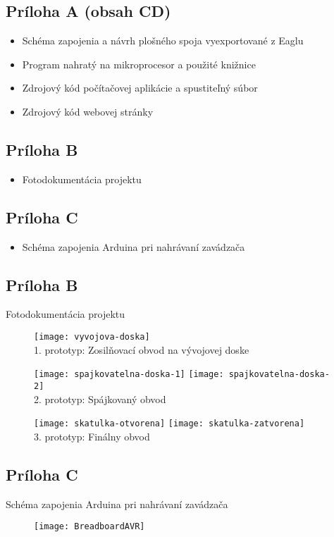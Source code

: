 \documentclass[titlepage,12pt]{article}
\begin{document}
\subsection*{Príloha A (obsah CD)}
\begin{itemize}
	\item Schéma zapojenia a návrh plošného spoja vyexportované z Eaglu
	\item Program nahratý na mikroprocesor a použité knižnice
	\item Zdrojový kód počítačovej aplikácie a spustiteľný súbor
	\item Zdrojový kód webovej stránky
\end{itemize}
\subsection*{Príloha B}
\begin{itemize}
	\item Fotodokumentácia projektu
\end{itemize}
\subsection*{Príloha C}
\begin{itemize}
	\item Schéma zapojenia Arduina pri nahrávaní zavádzača
\end{itemize}


\newpage 
\subsection*{Príloha B}
Fotodokumentácia projektu
\begin{figure}[!ht]
\begin{center}
\texttt{[image: vyvojova-doska]}
\\1. prototyp: Zosilňovací obvod na vývojovej doske
\end{center}
\end{figure}

\begin{figure}[!ht]
\begin{center}
\texttt{[image: spajkovatelna-doska-1]}
\texttt{[image: spajkovatelna-doska-2]}
\\2. prototyp: Spájkovaný obvod
\end{center}
\end{figure}

\begin{figure}[!ht]
\begin{center}
\texttt{[image: skatulka-otvorena]}
\texttt{[image: skatulka-zatvorena]}
\\3. prototyp: Finálny obvod
\end{center}
\end{figure}

\newpage
\subsection*{Príloha C}
Schéma zapojenia Arduina pri nahrávaní zavádzača
\begin{figure}[!ht]
\texttt{[image: BreadboardAVR]}
\end{figure}
\end{document}
